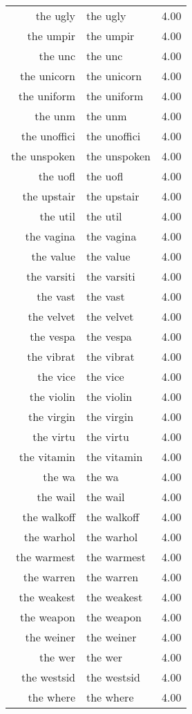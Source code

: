 \begin{table}[ht]
\begin{tabular}{rlr}
  the ugly & the ugly & 4.00 \\ 
  the umpir & the umpir & 4.00 \\ 
  the unc & the unc & 4.00 \\ 
  the unicorn & the unicorn & 4.00 \\ 
  the uniform & the uniform & 4.00 \\ 
  the unm & the unm & 4.00 \\ 
  the unoffici & the unoffici & 4.00 \\ 
  the unspoken & the unspoken & 4.00 \\ 
  the uofl & the uofl & 4.00 \\ 
  the upstair & the upstair & 4.00 \\ 
  the util & the util & 4.00 \\ 
  the vagina & the vagina & 4.00 \\ 
  the value & the value & 4.00 \\ 
  the varsiti & the varsiti & 4.00 \\ 
  the vast & the vast & 4.00 \\ 
  the velvet & the velvet & 4.00 \\ 
  the vespa & the vespa & 4.00 \\ 
  the vibrat & the vibrat & 4.00 \\ 
  the vice & the vice & 4.00 \\ 
  the violin & the violin & 4.00 \\ 
  the virgin & the virgin & 4.00 \\ 
  the virtu & the virtu & 4.00 \\ 
  the vitamin & the vitamin & 4.00 \\ 
  the wa & the wa & 4.00 \\ 
  the wail & the wail & 4.00 \\ 
  the walkoff & the walkoff & 4.00 \\ 
  the warhol & the warhol & 4.00 \\ 
  the warmest & the warmest & 4.00 \\ 
  the warren & the warren & 4.00 \\ 
  the weakest & the weakest & 4.00 \\ 
  the weapon & the weapon & 4.00 \\ 
  the weiner & the weiner & 4.00 \\ 
  the wer & the wer & 4.00 \\ 
  the westsid & the westsid & 4.00 \\ 
  the where & the where & 4.00 \\ 

\end{tabular}
\end{table}
